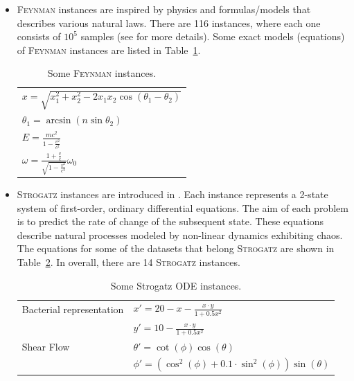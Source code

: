 \documentclass[a4paper,12pt]{elsarticle}
\begin{document}
\begin{itemize}
	\item \textsc{Feynman} instances are inspired by physics and formulas/models that describes various natural laws.  
	There are 116 instances, where each one consists of $10^5$  samples (see \cite{udrescu2020ai} for more details). Some exact models (equations) of \textsc{Feynman} instances are listed in Table~\ref{tab:Feynamn-Eq}.  
	
	\begin{table}[!ht]
		\centering
		\begin{tabular}{l}   \hline
			$x = \sqrt{x_1^2 + x_2^2 - 2 x_1 x_2 \cos(\theta_1 - \theta_2)}$ \\
			$ \theta_1 = \arcsin(n \sin \theta_2)$ \\
			$E =  \frac{m c^2 }{1 - \frac{v^2}{c^2}}$ \\
			$\omega = \frac{1 + \frac{v}{c}}{ \sqrt{1 - \frac{v^2}{c^2}}} \omega_0$ \\ \hline
			
		\end{tabular}
		\caption{Some \textsc{Feynman} instances.}
		\label{tab:Feynamn-Eq}
	\end{table}
	
	
	\item \textsc{Strogatz} instances are introduced in \cite{la2016inference}. 
	Each instance represents a 2-state system of first-order, ordinary differential equations. 
	The aim of each problem is to predict the rate of change of the subsequent state. These equations describe natural processes modeled by non-linear dynamics exhibiting chaos.  The equations for some of the datasets that belong \textsc{Strogatz} are shown in Table~\ref{table:strogatz-ODEs}. In overall, there are 14 \textsc{Strogatz} instances. 
	
	
	\begin{table}
		\centering
		\begin{tabular}{ll} \\ \hline
			Bacterial representation &   $x' = 20 - x - \frac{x \cdot y}{1 + 0.5 x^2 }$ \\ 
			&   $y' = 10 - \frac{x \cdot y}{1 + 0.5 x^2  }$ \\ \hline
			Shear Flow               &  $\theta' = \cot(\phi)\cos(\theta)$ \\
			&  $ \phi'  = ( \cos^2(\phi) + 0.1 \cdot \sin^2 (\phi)) \sin(\theta) $ \\ \hline
		\end{tabular}
		\caption{Some Strogatz ODE instances.}
		\label{table:strogatz-ODEs}
	\end{table}
	
\end{itemize}
\end{document}
